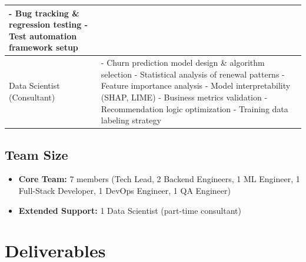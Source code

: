 \documentclass[12pt,a4paper]{article}
\begin{document}
\begin{longtable}{|p{3cm}|p{11cm}|}
- Bug tracking \& regression testing \newline
- Test automation framework setup \\
\hline
Data Scientist (Consultant) & - Churn prediction model design \& algorithm selection \newline
- Statistical analysis of renewal patterns \newline
- Feature importance analysis \newline
- Model interpretability (SHAP, LIME) \newline
- Business metrics validation \newline
- Recommendation logic optimization \newline
- Training data labeling strategy \\
\hline
\end{longtable}

\subsection{Team Size}
\begin{itemize}
    \item \textbf{Core Team:} 7 members (Tech Lead, 2 Backend Engineers, 1 ML Engineer, 1 Full-Stack Developer, 1 DevOps Engineer, 1 QA Engineer)
    \item \textbf{Extended Support:} 1 Data Scientist (part-time consultant)
\end{itemize}

\section{Deliverables}
\end{document}
